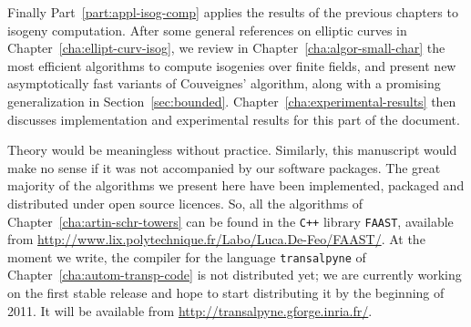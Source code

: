 Finally Part~\ref{part:appl-isog-comp} applies the results of the
previous chapters to isogeny computation. After some general
references on elliptic curves in Chapter~\ref{cha:ellipt-curv-isog},
we review in Chapter~\ref{cha:algor-small-char} the most efficient
algorithms to compute isogenies over finite fields, and present new
asymptotically fast variants of Couveignes' algorithm, along with a
promising generalization in
Section~\ref{sec:bounded}. Chapter~\ref{cha:experimental-results} then
discusses implementation and experimental results for this part of the
document.

Theory would be meaningless without practice. Similarly, this
manuscript would make no sense if it was not accompanied by our
software packages. The great majority of the algorithms we present
here have been implemented, packaged and distributed under open source
licences. So, all the algorithms of
Chapter~\ref{cha:artin-schr-towers} can be found in the \texttt{C++}
library \texttt{FAAST}, available from
\url{http://www.lix.polytechnique.fr/Labo/Luca.De-Feo/FAAST/}. At the
moment we write, the compiler for the language \texttt{transalpyne} of
Chapter~\ref{cha:autom-transp-code} is not distributed yet; we are
currently working on the first stable release and hope to start
distributing it by the beginning of 2011. It will be available from
\url{ http://transalpyne.gforge.inria.fr/}.




